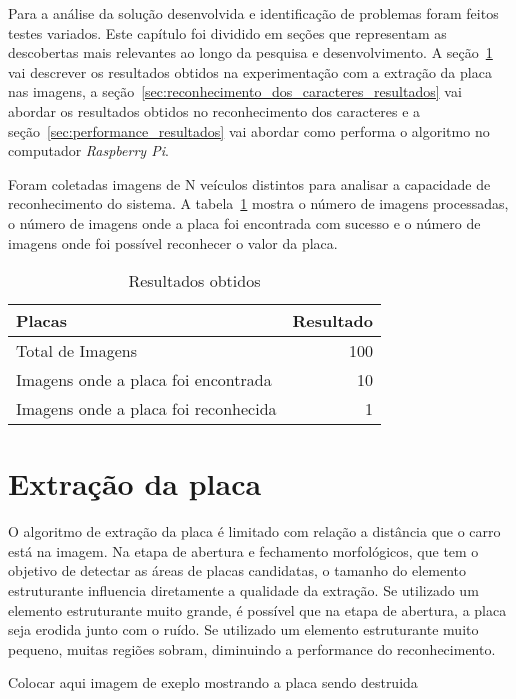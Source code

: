 Para a análise da solução desenvolvida e identificação de problemas foram feitos testes variados. Este capítulo foi dividido em seções que representam as descobertas mais relevantes ao longo da pesquisa e desenvolvimento. A seção~\ref{sec:extracao_da_placa_resultados} vai descrever os resultados obtidos na experimentação com a extração da placa nas imagens, a seção~\ref{sec:reconhecimento_dos_caracteres_resultados} vai abordar os resultados obtidos no reconhecimento dos caracteres e a seção~\ref{sec:performance_resultados} vai abordar como performa o algoritmo no computador \emph{Raspberry Pi}.

Foram coletadas imagens de N veículos distintos para analisar a capacidade de reconhecimento do sistema. A tabela~\ref{tab:resultados} mostra o número de imagens processadas, o número de imagens onde a placa foi encontrada com sucesso e o número de imagens onde foi possível reconhecer o valor da placa.

\begin{table}[]
\centering
\caption{Resultados obtidos}
\label{tab:resultados}
\begin{tabular}{@{}lr@{}}
\toprule
Placas                               & \multicolumn{1}{l}{Resultado} \\ \midrule
Total de Imagens                     & 100                           \\
Imagens onde a placa foi encontrada  & 10                            \\
Imagens onde a placa foi reconhecida & 1                            
\end{tabular}
\end{table}

\section{Extração da placa}
\label{sec:extracao_da_placa_resultados}


O algoritmo de extração da placa é limitado com relação a distância que o carro está na imagem. Na etapa de abertura e fechamento morfológicos, que tem o objetivo de detectar as áreas de placas candidatas, o tamanho do elemento estruturante influencia diretamente a qualidade da extração. Se utilizado um elemento estruturante muito grande, é possível que na etapa de abertura, a placa seja erodida junto com o ruído. Se utilizado um elemento estruturante muito pequeno, muitas regiões sobram, diminuindo a performance do reconhecimento. 

Colocar aqui imagem de exeplo mostrando a placa sendo destruida

